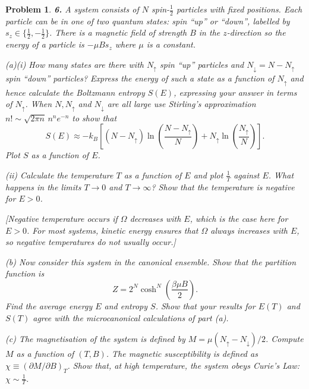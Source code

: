 \documentclass[11pt]{article}
\newtheorem*{problem}{Problem}
\begin{document}
\begin{problem}
\textbf{6.} A system consists of $N$ spin-$\frac12$ particles with fixed positions. Each particle
can be in one of two quantum states: spin ``up'' or ``down'', labelled by
$s_z\in\{\frac12,-\frac12\}$. There is a magnetic field of strength $B$ in the $z$-direction so
the energy of a particle is $-\mu Bs_z$ where $\mu$ is a constant.

(a)(i) How many states are there with $N_\uparrow$ spin ``up'' particles and
$N_\downarrow=N-N_\uparrow$ spin ``down'' particles? Express the energy of such a state as a
function of $N_\uparrow$ and hence calculate the Boltzmann entropy $S(E)$, expressing your
answer in terms of $N_\uparrow$. When $N,N_\uparrow$ and $N_\downarrow$ are all large use
Stirling's approximation $n!\sim\sqrt{2\pi n}\,n^ne^{-n}$ to show that
\[
S(E)\approx -k_B\left[(N-N_\uparrow)\ln\!\left(\frac{N-N_\uparrow}{N}\right)+N_\uparrow\ln\!\left(\frac{N_\uparrow}{N}\right)\right].
\]
Plot $S$ as a function of $E$.

(ii) Calculate the temperature $T$ as a function of $E$ and plot $\frac1T$ against $E$. What
happens in the limits $T\to0$ and $T\to\infty$? Show that the temperature is \textit{negative}
for $E>0$.

[Negative temperature occurs if $\Omega$ decreases with $E$, which is the case here for $E>0$.
For most systems, kinetic energy ensures that $\Omega$ always increases with $E$, so negative
temperatures do not usually occur.]

(b) Now consider this system in the canonical ensemble. Show that the partition function is
\[
Z=2^N\cosh^N\!\left(\frac{\beta\mu B}{2}\right).
\]
Find the average energy $E$ and entropy $S$. Show that your results for $E(T)$ and $S(T)$
agree with the microcanonical calculations of part (a).

(c) The \textit{magnetisation} of the system is defined by $M=\mu(N_\uparrow-N_\downarrow)/2$.
Compute $M$ as a function of $(T,B)$. The magnetic susceptibility is defined as
$\chi\equiv(\partial M/\partial B)_T$. Show that, at high temperature, the system obeys
\textit{Curie's Law}: $\chi\sim\frac1T$.
\end{problem}
\end{document}
